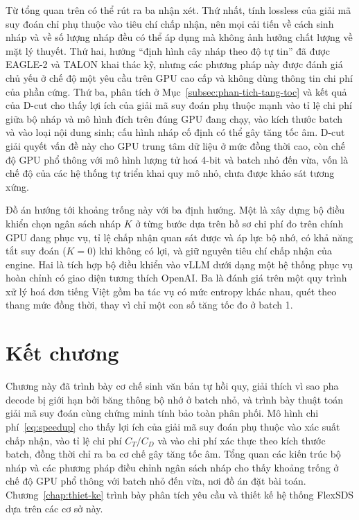 Từ tổng quan trên có thể rút ra ba nhận xét. Thứ nhất, tính lossless của giải mã suy đoán chỉ phụ thuộc vào tiêu chí chấp nhận, nên mọi cải tiến về cách sinh nháp và về số lượng nháp đều có thể áp dụng mà không ảnh hưởng chất lượng về mặt lý thuyết. Thứ hai, hướng ``định hình cây nháp theo độ tự tin'' đã được EAGLE-2 và TALON khai thác kỹ, nhưng các phương pháp này được đánh giá chủ yếu ở chế độ một yêu cầu trên GPU cao cấp và không dùng thông tin chi phí của phần cứng. Thứ ba, phân tích ở Mục~\ref{subsec:phan-tich-tang-toc} và kết quả của D-cut cho thấy lợi ích của giải mã suy đoán phụ thuộc mạnh vào tỉ lệ chi phí giữa bộ nháp và mô hình đích trên đúng GPU đang chạy, vào kích thước batch và vào loại nội dung sinh; cấu hình nháp cố định có thể gây tăng tốc âm. D-cut giải quyết vấn đề này cho GPU trung tâm dữ liệu ở mức đồng thời cao, còn chế độ GPU phổ thông với mô hình lượng tử hoá 4-bit và batch nhỏ đến vừa, vốn là chế độ của các hệ thống tự triển khai quy mô nhỏ, chưa được khảo sát tương xứng.

Đồ án hướng tới khoảng trống này với ba định hướng. Một là xây dựng bộ điều khiển chọn ngân sách nháp $K$ ở từng bước dựa trên hồ sơ chi phí đo trên chính GPU đang phục vụ, tỉ lệ chấp nhận quan sát được và áp lực bộ nhớ, có khả năng tắt suy đoán ($K=0$) khi không có lợi, và giữ nguyên tiêu chí chấp nhận của engine. Hai là tích hợp bộ điều khiển vào vLLM dưới dạng một hệ thống phục vụ hoàn chỉnh có giao diện tương thích OpenAI. Ba là đánh giá trên một quy trình xử lý hoá đơn tiếng Việt gồm ba tác vụ có mức entropy khác nhau, quét theo thang mức đồng thời, thay vì chỉ một con số tăng tốc đo ở batch 1.

\section{Kết chương}

Chương này đã trình bày cơ chế sinh văn bản tự hồi quy, giải thích vì sao pha decode bị giới hạn bởi băng thông bộ nhớ ở batch nhỏ, và trình bày thuật toán giải mã suy đoán cùng chứng minh tính bảo toàn phân phối. Mô hình chi phí~\eqref{eq:speedup} cho thấy lợi ích của giải mã suy đoán phụ thuộc vào xác suất chấp nhận, vào tỉ lệ chi phí $C_T/C_D$ và vào chi phí xác thực theo kích thước batch, đồng thời chỉ ra ba cơ chế gây tăng tốc âm. Tổng quan các kiến trúc bộ nháp và các phương pháp điều chỉnh ngân sách nháp cho thấy khoảng trống ở chế độ GPU phổ thông với batch nhỏ đến vừa, nơi đồ án đặt bài toán. Chương~\ref{chap:thiet-ke} trình bày phân tích yêu cầu và thiết kế hệ thống FlexSDS dựa trên các cơ sở này.
